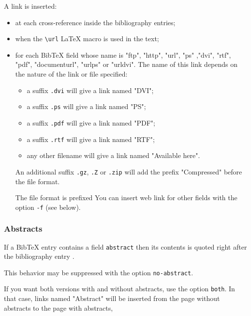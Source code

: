 \documentclass[11pt,a4paper]{article}
\newcommand{\mm}{\symbol{45}\symbol{45}}
\begin{document}
A link is inserted:
\begin{itemize}

\item  at each cross-reference inside the bibliography entries; 

\item  when the \verb|\url| LaTeX macro is used in the text; 

\item  for each BibTeX field whose name is "ftp", "http", "url", "ps"
  ,"dvi", "rtf", "pdf",
  "documenturl", "urlps" or "urldvi". The name of this link depends on
  the nature of the link or file specified: 
  \begin{itemize}
  \item a suffix \texttt{.dvi} will give a link named "DVI";
  \item a suffix \texttt{.ps} will give a link named "PS";
  \item a suffix \texttt{.pdf} will give a link named "PDF";
  \item a suffix \texttt{.rtf} will give a link named "RTF";
  \item any other filename will give a link named "Available here".
  \end{itemize}
  
  An additional suffix \texttt{.gz}, \texttt{.Z} or
  \texttt{.zip} will add the prefix "Compressed" before the
  file format.

  The file format is prefixed 
  You can insert web link for other fields with the option
  \texttt{-f} (see below).
  
\end{itemize}



\subsubsection{Abstracts}

If a BibTeX entry contains a field \texttt{abstract} then its contents
is quoted right after the bibliography entry
. 

This behavior may be suppressed with the option \texttt{\mm{}no-abstract}.

If you want both versions with and without abstracts, use the option
\texttt{\mm{}both}. In that case, links named "Abstract" will be
inserted from the page without abstracts to the page with abstracts,
\end{document}
